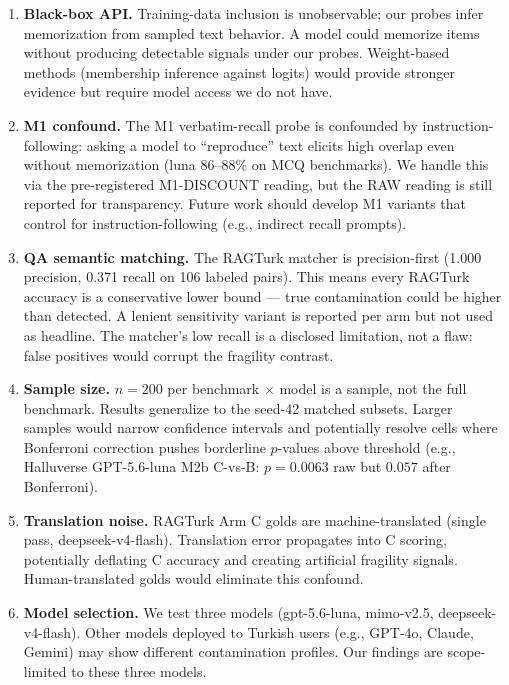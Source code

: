 \documentclass[11pt]{article}
\begin{document}
\begin{enumerate}
\item \textbf{Black-box API.} Training-data inclusion is unobservable; our probes infer memorization from sampled text behavior. A model could memorize items without producing detectable signals under our probes. Weight-based methods (membership inference against logits) would provide stronger evidence but require model access we do not have.

\item \textbf{M1 confound.} The M1 verbatim-recall probe is confounded by instruction-following: asking a model to ``reproduce'' text elicits high overlap even without memorization (luna 86--88\% on MCQ benchmarks). We handle this via the pre-registered M1-DISCOUNT reading, but the RAW reading is still reported for transparency. Future work should develop M1 variants that control for instruction-following (e.g., indirect recall prompts).

\item \textbf{QA semantic matching.} The RAGTurk matcher is precision-first (1.000 precision, 0.371 recall on 106 labeled pairs). This means every RAGTurk accuracy is a conservative lower bound --- true contamination could be higher than detected. A lenient sensitivity variant is reported per arm but not used as headline. The matcher's low recall is a disclosed limitation, not a flaw: false positives would corrupt the fragility contrast.

\item \textbf{Sample size.} $n=200$ per benchmark $\times$ model is a sample, not the full benchmark. Results generalize to the seed-42 matched subsets. Larger samples would narrow confidence intervals and potentially resolve cells where Bonferroni correction pushes borderline $p$-values above threshold (e.g., Halluverse GPT-5.6-luna M2b C-vs-B: $p{=}0.0063$ raw but $0.057$ after Bonferroni).

\item \textbf{Translation noise.} RAGTurk Arm C golds are machine-translated (single pass, deepseek-v4-flash). Translation error propagates into C scoring, potentially deflating C accuracy and creating artificial fragility signals. Human-translated golds would eliminate this confound.

\item \textbf{Model selection.} We test three models (gpt-5.6-luna, mimo-v2.5, deepseek-v4-flash). Other models deployed to Turkish users (e.g., GPT-4o, Claude, Gemini) may show different contamination profiles. Our findings are scope-limited to these three models.


\end{enumerate}
\end{document}
